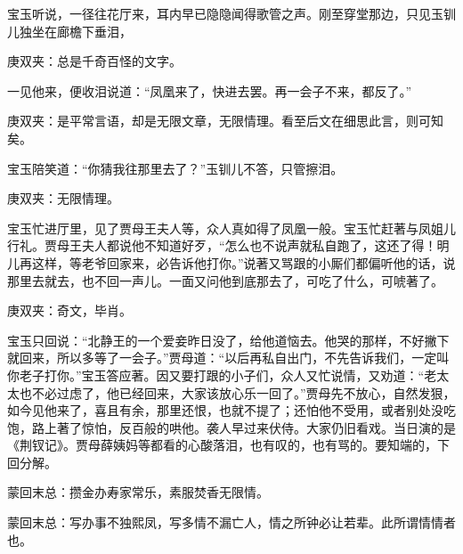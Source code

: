 \begin{parag}
    宝玉听说，一径往花厅来，耳内早已隐隐闻得歌管之声。刚至穿堂那边，只见玉钏儿独坐在廊檐下垂泪，\begin{note}庚双夹：总是千奇百怪的文字。\end{note}一见他来，便收泪说道：“凤凰来了，快进去罢。再一会子不来，都反了。”\begin{note}庚双夹：是平常言语，却是无限文章，无限情理。看至后文在细思此言，则可知矣。\end{note}宝玉陪笑道：“你猜我往那里去了？”玉钏儿不答，只管擦泪。\begin{note}庚双夹：无限情理。\end{note}宝玉忙进厅里，见了贾母王夫人等，众人真如得了凤凰一般。宝玉忙赶著与凤姐儿行礼。贾母王夫人都说他不知道好歹，“怎么也不说声就私自跑了，这还了得！明儿再这样，等老爷回家来，必告诉他打你。”说著又骂跟的小厮们都偏听他的话，说那里去就去，也不回一声儿。一面又问他到底那去了，可吃了什么，可唬著了。\begin{note}庚双夹：奇文，毕肖。\end{note}宝玉只回说：“北静王的一个爱妾昨日没了，给他道恼去。他哭的那样，不好撇下就回来，所以多等了一会子。”贾母道：“以后再私自出门，不先告诉我们，一定叫你老子打你。”宝玉答应著。因又要打跟的小子们，众人又忙说情，又劝道：“老太太也不必过虑了，他已经回来，大家该放心乐一回了。”贾母先不放心，自然发狠，如今见他来了，喜且有余，那里还恨，也就不提了；还怕他不受用，或者别处没吃饱，路上著了惊怕，反百般的哄他。袭人早过来伏侍。大家仍旧看戏。当日演的是《荆钗记》。贾母薛姨妈等都看的心酸落泪，也有叹的，也有骂的。要知端的，下回分解。
\end{parag}


\begin{parag}
    \begin{note}蒙回末总：攒金办寿家常乐，素服焚香无限情。\end{note}
\end{parag}


\begin{parag}
    \begin{note}蒙回末总：写办事不独熙凤，写多情不漏亡人，情之所钟必让若辈。此所谓情情者也。\end{note}
\end{parag}

